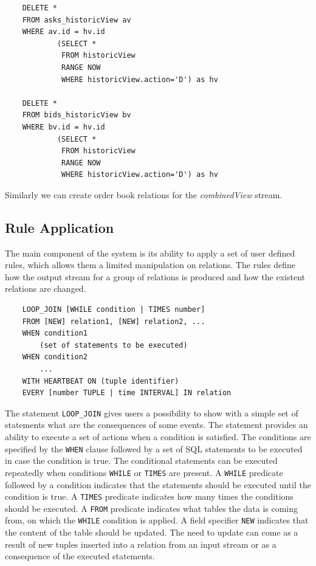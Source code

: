 \documentclass{article}
\begin{document}
\begin{verbatim}  
    DELETE *
    FROM asks_historicView av
    WHERE av.id = hv.id
            (SELECT * 
             FROM historicView
             RANGE NOW
             WHERE historicView.action='D') as hv  

    DELETE *
    FROM bids_historicView bv
    WHERE bv.id = hv.id
            (SELECT * 
             FROM historicView
             RANGE NOW
             WHERE historicView.action='D') as hv 
\end{verbatim}

Similarly we can create order book relations for the \emph{combinedView} stream.

\subsection{Rule Application}

The main component of the system is its ability to apply a set of user defined rules, which allows them a limited manipulation on relations. The rules define how the output stream for a group of relations is produced and how the existent relations are changed. 

\begin{verbatim}
    LOOP_JOIN [WHILE condition | TIMES number]
    FROM [NEW] relation1, [NEW] relation2, ... 
    WHEN condition1
        (set of statements to be executed)
    WHEN condition2
        ...
    WITH HEARTBEAT ON (tuple identifier)
    EVERY [number TUPLE | time INTERVAL] IN relation 
\end{verbatim}

The statement {\tt LOOP\_JOIN} gives users a possibility to show with a simple set of statements what are the consequences of some events. The statement provides an ability to execute a set of actions when a condition is satisfied. The conditions are specified by the {\tt WHEN} clause followed by a set of SQL statements to be executed in case the condition is true. The conditional statements can be executed repeatedly when conditions {\tt WHILE} or {\tt TIMES} are present. A {\tt WHILE} predicate followed by a condition indicates that the statements should be executed until the condition is true. A {\tt TIMES} predicate indicates how many times the conditions should be executed. A {\tt FROM} predicate indicates what tables the data is coming from, on which the {\tt WHILE} condition is applied. A field specifier {\tt NEW} indicates that the content of the table should be updated. The need to update can come as a result of new tuples inserted into a relation from an input stream or as a consequence of the executed statements.   
\end{document}
